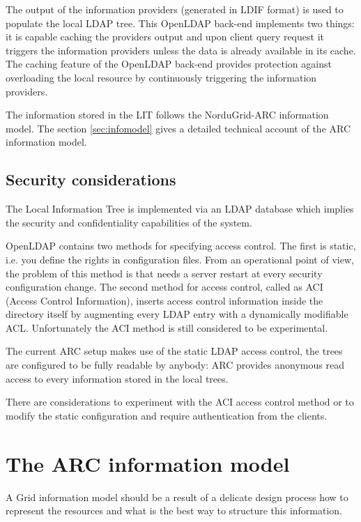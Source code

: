 \documentclass{article}
\begin{document}
The output of the information providers (generated in LDIF format) is
used to populate the local LDAP tree. This OpenLDAP back-end
implements two things: it is capable caching the providers output and
upon client query request it triggers the information providers unless
the data is already available in its cache.  The caching feature of
the OpenLDAP back-end provides protection against overloading the
local resource by continuously triggering the information providers.

The information stored in the LIT follows the NorduGrid-ARC
information model.  The section \ref{sec:infomodel} gives a detailed
technical account of the ARC information model.

\subsection{Security considerations}

The Local Information Tree is implemented via an LDAP database which implies the security and
confidentiality capabilities of the system. 

OpenLDAP\cite{Openldap} contains two methods for specifying access control. 
The first is static, i.e. you define the rights in configuration files.
From an operational point of view, the problem of this method is that needs a 
server restart at every security configuration change.
The second method for access control, called as ACI (Access Control Information), 
inserts access control information inside the directory itself by augmenting 
every LDAP entry with a dynamically  modifiable ACL.
Unfortunately the ACI method is still considered to be experimental.

The current ARC setup makes use of the static LDAP access control, the trees are 
configured to be fully readable by anybody: ARC provides  anonymous read
access to every information stored in the local trees.

There are considerations to experiment with the ACI access control method  
or to modify the static configuration and require authentication
from the clients.


\section{The ARC information model \label{sec:infomodel}}

A Grid information model should be a result of a
delicate design process how to represent the resources and what is
the best way to structure this information. 
\end{document}
